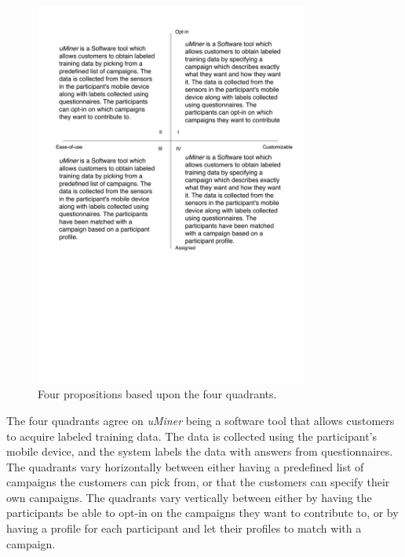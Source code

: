 \begin{figure}[!htbp]
	\centering
	\includegraphics[width=0.8\textwidth]{graphic/problem_analysis/vision/propositions.pdf}
	\caption{Four propositions based upon the four quadrants.}
	\label{fig:proposition}
\end{figure}
\FloatBarrier

The four quadrants agree on \emph{uMiner} being a software tool that allows customers to acquire labeled training data. The data is collected using the participant's mobile device, and the system labels the data with answers from questionnaires. The quadrants vary horizontally between either having a predefined list of campaigns the customers can pick from, or that the customers can specify their own campaigns. The quadrants vary vertically between either by having the participants be able to opt-in on the campaigns they want to contribute to, or by having a profile for each participant and let their profiles to match with a campaign.
